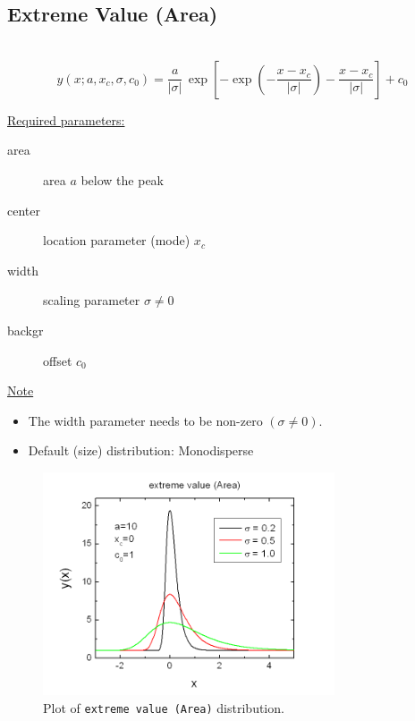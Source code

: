 \clearpage
\subsection{Extreme Value (Area)} ~\\
\label{sec:ExtremeValueArea}
\begin{equation}
y(x;a,x_c,\sigma,c_0) = \frac{a}{|\sigma|} \,
\exp\left[-\exp\left(-\frac{x-x_c}{|\sigma|}\right)-\frac{x-x_c}{|\sigma|}\right]
+c_0
\end{equation}
\vspace{5mm}

\underline{Required parameters:}
\begin{description}
    \item[area] area $a$ below the peak
    \item[center] location parameter (mode) $x_c$
    \item[width] scaling parameter $\sigma \neq 0$
    \item[backgr] offset $c_0$
\end{description}

\underline{Note}
\begin{itemize}
  \item The width parameter needs to be non-zero $(\sigma\neq 0)$.
  \item Default (size) distribution: Monodisperse
\end{itemize}
\begin{figure}[htb]
\begin{center}
\includegraphics[width=0.768\textwidth]{ExtremeValueArea.png}
\end{center}
\caption{Plot of \texttt{extreme value (Area)} distribution.}
\label{fig:ExtremeValueArea}
\end{figure}

